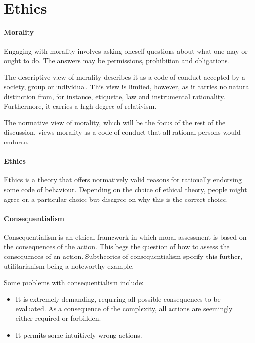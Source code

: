 \section{Ethics}

\paragraph{Morality}
Engaging with morality involves asking oneself questions about what one may or ought to do. The answers may be permissions, prohibition and obligations.

The descriptive view of morality describes it as a code of conduct accepted by a society, group or individual. This view is limited, however, as it carries no natural distinction from, for instance, etiquette, law and instrumental rationality. Furthermore, it carries a high degree of relativism.

The normative view of morality, which will be the focus of the rest of the discussion, views morality as a code of conduct that all rational persons would endorse.

\paragraph{Ethics}
Ethics is a theory that offers normatively valid reasons for rationally endorsing some code of behaviour. Depending on the choice of ethical theory, people might agree on a particular choice but disagree on why this is the correct choice.

\paragraph{Consequentialism}
Consequentialism is an ethical framework in which moral assessment is based on the consequences of the action. This begs the question of how to assess the consequences of an action. Subtheories of consequentialism specify this further, utilitarianism being a noteworthy example.

Some problems with consequentialism include:
\begin{itemize}
	\item It is extremely demanding, requiring all possible consequences to be evaluated. As a consequence of the complexity, all actions are seemingly either required or forbidden.
	\item It permits some intuitively wrong actions.
\end{itemize}

